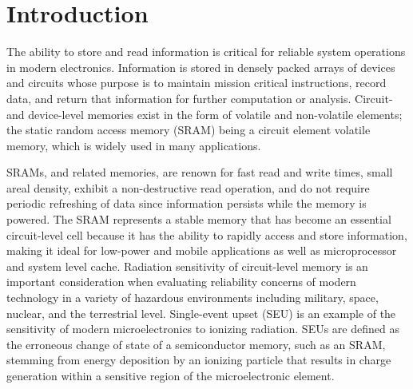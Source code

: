 \chapter{Introduction} %
\label{cha:introduction}
The ability to store and read information is critical for reliable system operations in modern electronics. 
Information is stored in densely packed arrays of devices and circuits whose purpose is to maintain mission critical instructions, record data, and return that information for further computation or analysis.
Circuit- and device-level memories exist in the form of volatile and non-volatile elements; the static random access memory (SRAM) being a circuit element volatile memory, which is widely used in many applications.

SRAMs, and related memories, are renown for fast read and write times, small areal density, exhibit a non-destructive read operation, and do not require periodic refreshing of data since information persists while the memory is powered.
The SRAM represents a stable memory that has become an essential circuit-level cell because it has the ability to rapidly access and store information, making it ideal for low-power and mobile applications as well as microprocessor and system level cache.
Radiation sensitivity of circuit-level memory is an important consideration when evaluating reliability concerns of modern technology in a variety of hazardous environments including military, space, nuclear, and the terrestrial level. 
Single-event upset (SEU) is an example of the sensitivity of modern microelectronics to ionizing radiation. SEUs are defined as the erroneous change of state of a semiconductor memory, such as an SRAM, stemming from energy deposition by an ionizing particle that results in charge generation within a sensitive region of the microelectronic element.

